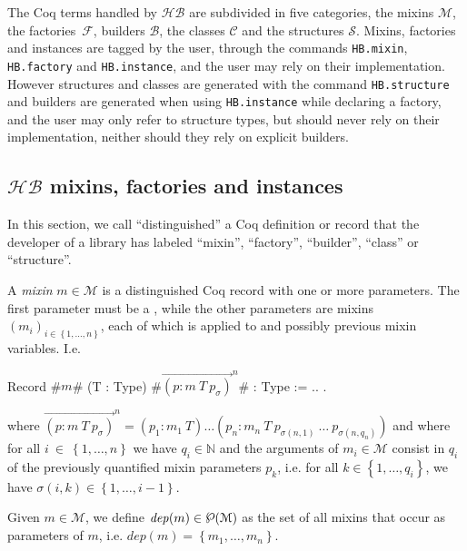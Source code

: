 \documentclass[a4paper,UKenglish,cleveref, autoref]{lipics-v2019}
\newcommand{\HB}{\ensuremath{\mathcal{HB}}}
\newcommand{\mixin}{mixin}
\newcommand{\mixins}{mixins}
\newcommand{\Mixins}{Mixins}
\newcommand{\M}{\ensuremath{\mathcal{M}}}
\newcommand{\factory}{factory}
\newcommand{\factories}{factories}
\newcommand{\mixinbuilder}{builder}
\newcommand{\mixinbuilders}{builders}
\newcommand{\F}{\ensuremath{\mathcal{F}}}
\newcommand{\dep}{\ensuremath{\mathit{dep}}}
\newcommand{\powerset}[1]{\raisebox{.15\baselineskip}{\Large\ensuremath{\wp}}(#1)}
\newcommand{\C}{\ensuremath{\mathcal{C}}}
\newcommand{\B}{\ensuremath{\mathcal{B}}}
\newcommand{\class}{class}
\newcommand{\classes}{classes}
\newcommand{\Str}{\ensuremath{\mathcal{S}}}
\newcommand{\structure}{structure}
\newcommand{\structures}{structures}
\newcommand{\set}[1]{\left\{#1\right\}}
\newcommand{\enum}[2]{\ensuremath{\set{#1,\ldots,#2}}}
\newcommand{\vect}[1]{\overrightarrow{#1}}
\newcommand{\pmp}[1]{\ensuremath{\vect{\left(p : m\ T\ p_\sigma\right)}^{#1}}}
\newcommand{\hbmixin}{{\tt\color{dkgreen}HB.mixin}}
\newcommand{\hbfactory}{{\tt\color{dkgreen}HB.factory}}
\newcommand{\hbinstance}{{\tt\color{dkgreen}HB.instance}}
\newcommand{\hbstructure}{{\tt\color{dkgreen}HB.structure}}
\theoremstyle{implem}
\theoremstyle{implem}
\theoremstyle{command}
\theoremstyle{commands}
\begin{document}
The Coq terms handled by \HB{} are subdivided in five categories, the
\mixins{} \(\M{}\), the \factories{}~\(\F{}\), \mixinbuilders{}
\(\B{}\), the \classes{} \(\C{}\) and the \structures{}
\(\Str{}\). \Mixins{}, \factories{} and instances are tagged by the
user, through the commands \hbmixin{}, \hbfactory{} and \hbinstance{},
and the user may rely on their implementation. However structures and
classes are generated with the command \hbstructure{} and builders are
generated when using \hbinstance{} while declaring a \factory{}, and
the user may only refer to structure types, but should never rely on
their implementation, neither should they rely on explicit builders.

\subsection{\HB{} \mixins{}, \factories{} and instances}
\label{sec:hb-mixins-factories}

In this section, we call ``distinguished'' a Coq definition or record
that the developer of a library has labeled ``\mixin{}'', ``\factory{}'',
``\mixinbuilder{}'', ``\class{}'' or ``\structure{}''.

\begin{definition}[\M{}, \mixins{}]
  A \emph{\mixin{}} \(m \in \M{}\) is a distinguished Coq record with one or more
  parameters.  The first parameter must be a , while
  the other parameters are \mixins{} \(\left(m_i\right)_{i \in \enum1n}\), each of which
  is applied to  and possibly previous mixin variables. I.e.
\begin{coqcode}
Record #$m$# (T : Type) #\(\pmp{n}\)# : Type := { .. }.
\end{coqcode}
where \(\pmp{n} = (p_1 : m_1\ T) \ldots \left(p_n : m_n\ T\ p_{\sigma(n,1)}\ \ldots\ p_{\sigma(n,q_n)}\right)\)
and where for all \(i~\in~\enum1n\) we have \(q_i \in \mathbb{N}\) and the
arguments of \(m_i \in \M{}\) consist in $q_i$ of the previously quantified
mixin parameters $p_k$, i.e. for all \(k \in \enum1{q_i}\), we
have \(\sigma(i,k) \in \enum1{i-1}\).
\end{definition}

\begin{definition}[\dep{}, \mixin{} dependencies]
  Given \(m \in \M{}\), we define \(\dep{}(m) \in \powerset\M{}\)
  as the set of all \mixins{} that occur as parameters of \(m\), i.e.
  \(\dep{}(m) = \enum{m_1}{m_n}\).
\end{definition}
\end{document}
